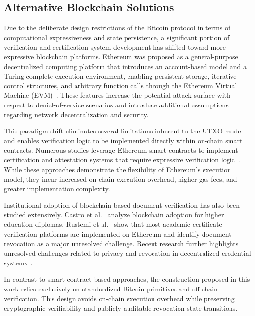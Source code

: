 \documentclass{ieeeaccess}
\begin{document}
\subsection{Alternative Blockchain Solutions}
\label{sec.alternativeblockchain}

Due to the deliberate design restrictions of the Bitcoin protocol in terms of computational expressiveness and state persistence, a significant portion of verification and certification system development has shifted toward more expressive blockchain platforms.
Ethereum was proposed as a general-purpose decentralized computing platform that introduces an account-based model and a Turing-complete execution environment, enabling persistent storage, iterative control structures, and arbitrary function calls through the Ethereum Virtual Machine (EVM)~\cite{buterin2014ethereum}.
These features increase the potential attack surface with respect to denial-of-service scenarios and introduce additional assumptions regarding network decentralization and security.

This paradigm shift eliminates several limitations inherent to the UTXO model and enables verification logic to be implemented directly within on-chain smart contracts.
Numerous studies leverage Ethereum smart contracts to implement certification and attestation systems that require expressive verification logic~\cite{Wang2019BlockchainCT,Li2020DecentralizedPKI,Pennino2021EfficientCertification,Palmisano2022NotarizationAntiPlagiarism,Mishra2025BlockchainDecentralized,Harer2022DecentralizedAttestation}.
While these approaches demonstrate the flexibility of Ethereum’s execution model, they incur increased on-chain execution overhead, higher gas fees, and greater implementation complexity.

Institutional adoption of blockchain-based document verification has also been studied extensively.
Castro et al.~\cite{Castro2021BlockchainHigherEducation} analyze blockchain adoption for higher education diplomas.
Rustemi et al.~\cite{Rustemi2023SLRBlockchainCertificates} show that most academic certificate verification platforms are implemented on Ethereum and identify document revocation as a major unresolved challenge.
Recent research further highlights unresolved challenges related to privacy and revocation in decentralized credential systems~\cite{Ramica2024SelectiveDisclosure,Zhang2025PrivacyProtectionIssuanceRevocationVerifiableCredentials}.

In contrast to smart-contract-based approaches, the construction proposed in this work relies exclusively on standardized Bitcoin primitives and off-chain verification.
This design avoids on-chain execution overhead while preserving cryptographic verifiability and publicly auditable revocation state transitions.
\end{document}
